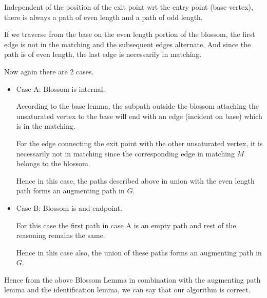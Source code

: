 \documentclass{article}
\begin{document}
Independent of the position of the exit point wrt the entry point (base vertex), there is always a path of even length and a path of odd length. 

If we traverse from the base on the even length portion of the blossom, the first edge is not in the matching and the subsequent edges alternate. And since the path is of even length, the last edge is necessarily in matching.

Now again there are 2 cases.
\begin{itemize}
    \item Case A: Blossom is internal.
        
        According to the base lemma, the subpath outside the blossom attaching the unsaturated vertex to the base will end with an edge (incident on base) which is in the matching.
        
        For the edge connecting the exit point with the other unsaturated vertex, it is necessarily not in matching since the corresponding edge in matching $M$ belongs to the blossom.
        
        Hence in this case, the paths described above in union with the even length path forms an augmenting path in $G$.
    \item Case B: Blossom is and endpoint.
    
        For this case the first path in case A is an empty path and rest of the reasoning remains the same.
        
        Hence in this case also, the union of these paths forms an augmenting path in $G$.
\end{itemize}
Hence from the above Blossom Lemma in combination with the augmenting path lemma and the identification lemma, we can say that our algorithm is correct.
\end{document}
